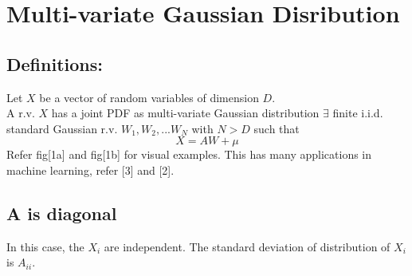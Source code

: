 \documentclass{article}
\begin{document}

\section{Multi-variate Gaussian Disribution}
\subsection{Definitions:}
Let $X$ be a vector of random variables of dimension $D$.\\
A r.v. $X$ has a joint PDF as multi-variate Gaussian distribution $\exists$ finite i.i.d. standard Gaussian
r.v. $W_{1}, W_{2},...W_{N}$ with $N>D$ such that \\
\begin{equation*}
    X = AW + \mu
\end{equation*}
Refer fig[1a] and fig[1b] for visual examples. This has many applications in machine learning, refer
[3] and [2].

\subsection{A is diagonal}
In this case, the $X_i$ are independent. The standard deviation of distribution of $X_i$ is $A_{ii}$.
\end{document}

